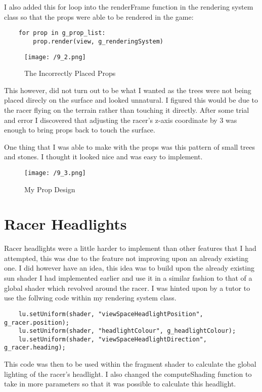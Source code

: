 \documentclass[11pt, oneside, a4paper]{article}
\begin{document}
I also added this for loop into the renderFrame function in the rendering system class so that the props were able to be rendered in the game:
\begin{lstlisting}
    for prop in g_prop_list:
        prop.render(view, g_renderingSystem)
\end{lstlisting}

\begin{figure}[!ht]
	\centerline{\texttt{[image: /9\_2.png]}}
	\caption{The Incorrectly Placed Props}
	\label{fig:figure16}
\end{figure}
This however, did not turn out to be what I wanted as the trees were not being placed direcly on the surface and looked unnatural. I figured this would be due to the racer flying on the terrain rather than touching it directly. After some trial and error I discovered that adjusting the racer's z-axis coordinate by 3 was enough to bring props back to touch the surface.

One thing that I was able to make with the props was this pattern of small trees and stones. I thought it looked nice and was easy to implement. 
\begin{figure}[!ht]
	\centerline{\texttt{[image: /9\_3.png]}}
	\caption{My Prop Design}
	\label{fig:figure16}
\end{figure}

\newpage
\section{Racer Headlights}
Racer headlights were a little harder to implement than other features that I had attempted, this was due to the feature not improving upon an already existing one. I did however have an idea, this idea was to build upon the already existing sun shader I had implemented earlier and use it in a similar fashion to that of a global shader which revolved around the racer. I was hinted upon by a tutor to use the follwing code within my rendering system class.

\begin{lstlisting}
    lu.setUniform(shader, "viewSpaceHeadlightPosition", g_racer.position);
    lu.setUniform(shader, "headlightColour", g_headlightColour);
    lu.setUniform(shader, "viewSpaceHeadlightDirection", g_racer.heading);
\end{lstlisting}

This code was then to be used within the fragment shader to calculate the global lighting of the racer's headlight. I also changed the computeShading function to take in more parameters so that it was possible to calculate this headlight.
\end{document}
